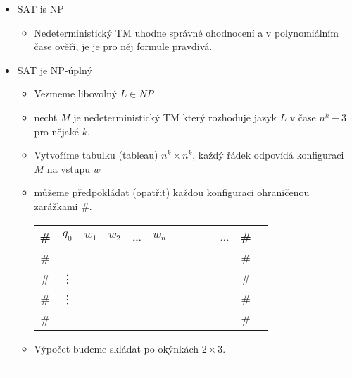     
    \begin{frame}{}
    \begin{proofs}
    \begin{itemize}
        \item SAT is NP
        
        \begin{itemize}
            \item Nedeterministický TM uhodne správné ohodnocení a v polynomiálním čase ověří, je je pro něj formule pravdivá.
        \end{itemize}
        \item SAT je NP-úplný
        
        \begin{itemize}
            \item Vezmeme libovolný $L\in NP$
            \item nechť $M$ je nedeterministický TM který rozhoduje jazyk $L$ v čase $n^k-3$ pro nějaké $k$.
            \item Vytvoříme tabulku (tableau) $n^k\times n^k$, každý řádek odpovídá konfiguraci $M$ na vstupu $w$
            \item můžeme předpokládat (opatřit) každou konfiguraci ohraničenou zarážkami $\#$.
        
            \begin{tabular}{|c|c|c|c|c|c|c|c|c|c|c|}\hline
            \# & $q_0$ & $w_1$ &$w_2$ & \ldots &$w_n$ & \_  &\_  &  \ldots &\# \\\hline
            \# &       &       &       &       &       &       &       &  &\# \\\hline
            \# & \vdots &       &       &       &       &       &       &&\# \\
            \# & \vdots &       &       &       &       &       &       &&\# \\\hline
            \# &       &       &       &       &       &       &       &  &\# \\\hline
                
            \end{tabular}
            \item Výpočet budeme skládat po okýnkách $2\times 3$.
            \begin{tabular}{|c|c|c|}\hline
     & & \\\hline
     & & \\\hline
            \end{tabular}
            
        \end{itemize}
    \end{itemize}
    \end{proofs}
    \end{frame}
    
